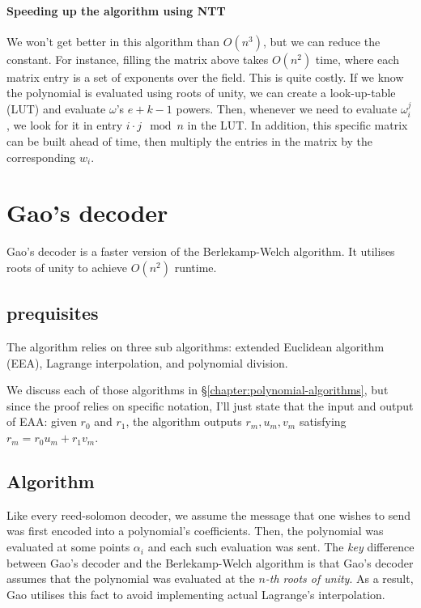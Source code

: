 
\paragraph{Speeding up the algorithm using NTT}
We won't get better in this algorithm than $O(n^3)$, but we can reduce the constant.
For instance, filling the matrix above takes $O(n^2)$ time, where each matrix entry 
is a set of exponents over the field. This is quite costly. 
If we know the polynomial is evaluated using roots of unity, we can 
create a look-up-table (LUT) and evaluate $\omega$'s $e+k-1$ powers. 
Then, whenever we need to evaluate $\omega_i^j$, we look for it in entry $i\cdot j \mod n$ 
in the LUT.
In addition, this specific matrix can be built ahead of time, then multiply the entries in 
the matrix by the corresponding $w_i$. 


\section{Gao's decoder}
Gao's decoder is a faster version of the Berlekamp-Welch algorithm.
It utilises roots of unity to achieve $O(n^2)$ runtime.

\subsection{prequisites}
The algorithm relies on three sub algorithms: extended Euclidean algorithm (EEA),
Lagrange interpolation, and polynomial division.

We discuss each of those algorithms in \S\ref{chapter:polynomial-algorithms}, 
but since the proof relies on specific notation, I'll just state 
that the input and output of EAA: given $r_0$ and $r_1$, the algorithm
outputs $r_m,u_m,v_m$ satisfying $r_m=r_0u_m+r_1v_m$.

\subsection{Algorithm}
Like every reed-solomon decoder, we assume the message that one 
wishes to send was first encoded into a polynomial's coefficients.
Then, the polynomial was evaluated at some points $\alpha_i$ and 
each such evaluation was sent.
The \emph{key} difference between Gao's decoder and the Berlekamp-Welch algorithm
is that Gao's decoder assumes that the polynomial was evaluated at
the \emph{$n$-th roots of unity}.
As a result, Gao utilises this fact to avoid implementing actual Lagrange's interpolation.

